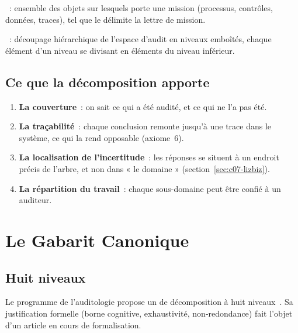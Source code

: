 \begin{boxdef}
~: ensemble des objets sur
lesquels porte une mission (processus, contrôles, données, traces), tel que
le délimite la lettre de mission.

\medskip
{}~: découpage hiérarchique de
l'espace d'audit en niveaux emboîtés, chaque élément d'un niveau se divisant
en éléments du niveau inférieur.
\end{boxdef}

\subsection{Ce que la décomposition apporte}

\begin{enumerate}
    \item \textbf{La couverture}~: on sait ce qui a été audité, et ce qui ne
          l'a pas été.
    \item \textbf{La traçabilité}~: chaque conclusion remonte jusqu'à une
          trace dans le système, ce qui la rend opposable (axiome~6).
    \item \textbf{La localisation de l'incertitude}~: les réponses \NEK{} se
          situent à un endroit précis de l'arbre, et non dans « le domaine »
          (section~\ref{sec:c07-lizbiz}).
    \item \textbf{La répartition du travail}~: chaque sous-domaine peut être
          confié à un auditeur.
\end{enumerate}

\section{Le Gabarit Canonique}
\label{sec:c07-gabarit}

\subsection{Huit niveaux}

Le programme de l'auditologie propose un  de décomposition à huit
niveaux~\cite{minka2026auditologie}. Sa justification formelle (borne
cognitive, exhaustivité, non-redondance) fait l'objet d'un article en cours
de formalisation.


